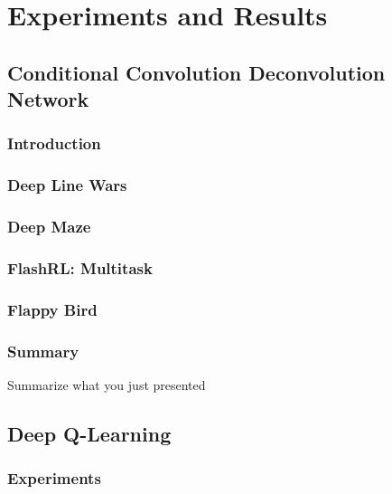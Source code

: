 \documentclass{uia}
\begin{document}
\part{Experiments and Results}

\chapter[Conditional Convolution Deconvolution Network]{Conditional Convolution Deconvolution Network}
\label{chap:results:ccdn}

\section{Introduction}
\label{sec:results:datagen:ccdn}

\section{Deep Line Wars}
\label{sec:results:datagen:dlw}

\section{Deep Maze}
\label{sec:results:datagen:ccdn:deepmaze}

\section{FlashRL: Multitask}
\label{sec:results:datagen:ccdn:flashrl}

\section{Flappy Bird}
\label{sec:results:datagen:ccdn:flappybird}

\section{Summary}
Summarize what you just presented

\chapter{Deep Q-Learning}
\label{chap:results:dqn}


\section{Experiments}
\end{document}
